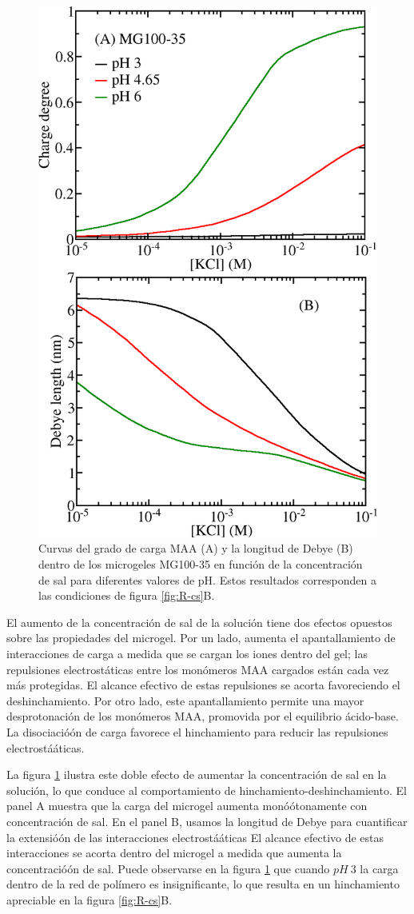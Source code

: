 \begin{figure}[!tb]
	\centering
	\includegraphics[width=0.5\linewidth]{Figures/graph-gel/f-cs.png}
	\caption{Curvas del grado de carga MAA (A) y la longitud de Debye (B) dentro de los microgeles MG100-35 en funci\'on de la concentraci\'on de sal para diferentes valores de pH.
		Estos resultados corresponden a las condiciones de figura \ref{fig:R-cs}B.}
	\label{fig:f-cs}
\end{figure}



El aumento de la concentraci\'on de sal de la soluci\'on tiene dos efectos opuestos sobre las propiedades del microgel.
Por un lado, aumenta el apantallamiento de interacciones de carga a medida que se cargan los iones dentro del gel; las repulsiones electrost\'aticas entre los mon\'omeros MAA cargados est\'an cada vez m\'as protegidas.
El alcance efectivo de estas repulsiones se acorta favoreciendo el deshinchamiento.
Por otro lado, este apantallamiento permite una mayor desprotonaci\'on de los mon\'omeros MAA, promovida por el equilibrio \'acido-base.
La disociació\'on de carga favorece el hinchamiento para reducir las repulsiones electrostá\'aticas.


La figura \ref{fig:f-cs} ilustra este doble efecto de aumentar la concentraci\'on de sal en la soluci\'on, lo que conduce al comportamiento de hinchamiento-deshinchamiento.
El panel A muestra que la carga del microgel aumenta monó\'otonamente con concentraci\'on de sal.
En el panel B, usamos la longitud de Debye para cuantificar la extensió\'on de las interacciones electrostá\'aticas %
El alcance efectivo de estas interacciones se acorta dentro del microgel a medida que aumenta la concentració\'on de sal.
Puede observarse en la figura \ref{fig:f-cs} que cuando $pH~3$ la carga dentro de la red de polímero es insignificante, lo que resulta en un hinchamiento apreciable en la figura \ref{fig:R-cs}B.



